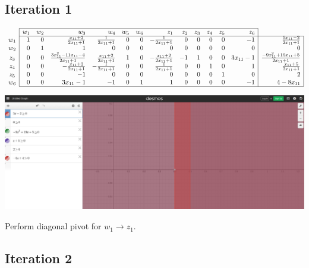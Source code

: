 \documentclass[12pt]{article}
\begin{document}
\subsection*{Iteration 1}

$\begin{array}{c|rrrrrrrrrrrr|r|}
\cline{2-13}
& w_1 & w_2 & w_3 & w_4 & w_5 & w_6 & z_1 & z_2 & z_3 & z_4 & z_5 & z_6 \\
\cline{2-14}
w_1 & 1 & 0 & \frac{x_{11} + 2}{2 x_{11} + 1} & \frac{1}{2 x_{11} + 1} & 0 & 0 & - \frac{1}{2 x_{11} + 1} & 0 & 0 & 0 & 0 & -1 & \frac{5 x_{11} - 2}{2 x_{11} +1} \\
w_2 & 0 & 1 & 1 & 0 & 0 & 0 & 0 & 0 & 0 & 0 & 0 & 0 & 0 \\
z_3 & 0 & 0 & \frac{3 x_{11}^{2} - 11 x_{11} - 4}{2 x_{11} + 1} & \frac{x_{11} + 2}{2 x_{11} + 1} & 1 & 0 & - \frac{x_{11} + 2}{2 x_{11} + 1} & -1 & 1 & 0 & 0 & 3 x_{11} - 1 & \frac{- 9 x_{11}^{2} + 19 x_{11} + 5}{2 x_{11} + 1} \\
z_4 & 0 & 0 & - \frac{x_{11} + 2}{2 x_{11} + 1} & - \frac{1}{2 x_{11} + 1} & 0 & 0 & \frac{1}{2 x_{11} + 1} & 0 & 0 & 1 & 0 & 1 & \frac{x_{11} + 5}{2 x_{11} + 1} \\
z_5 & 0 & 0 & -1 & 0 & 0 & 0 & 0 & 0 & 0 & 0 & 1 & 0 & 2 \\
w_6 & 0 & 0 & 3 x_{11} - 1 & -1 & 0 & 1 & 1 & 0 & 0 & 0 & 0 & -1 & 4 - 8 x_{11} \\
\cline{2-14}
\end{array}$

\begin{center}
\includegraphics[scale=.3]{Phase2_iteration1_visual}
\end{center}

Perform diagonal pivot for $w_1 \rightarrow z_1$.

\subsection*{Iteration 2}
\end{document}
